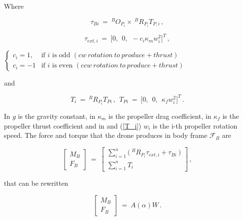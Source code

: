 Where

\begin{equation}
  \label{tau_b_i}
  \tau_{Bi}  \ = \ ^{B}O_{P_{i}} \times\   ^{B}R_{P_{i}} T_{P,i}\, ,
\end{equation}

\begin{equation}
  \label{tau_ext_i}
  \tau_{ext,i}  \ = \  \big[0, \ \  0, \ \  - c_i \kappa_m w_i^2 \big]^T \, ,
\end{equation}

\centerline{ $\begin{cases} c_i = 1, & \mbox{if } i \mbox{ is odd } (cw\ rotation\ to
\ produce + thrust)\\ c_i = -1 & \mbox{if } i\mbox{ is even } (ccw\ rotation\ to
\ produce + thrust) \end{cases}$ }

and

\begin{equation}
  \label{T_i}
  T_i  \ = \ ^{B}R_{P_{i}} T_{Pi} \, ,\ \ T_{Pi}  \ = \ \big[0, \ \ 0, \ \
  \kappa_f w_i^2 \big]^T\, .
\end{equation}

In  $g$ is the gravity constant, in  $\kappa_{m}$
is the propeller drag coefficient, in \Cref{T_i} $\kappa_{f}$ is the propeller
thrust coefficient and in \Cref{tau_ext_i} and (\ref{T_i}) $w_{i}$ is the i-th
propeller rotation speed.
The force and torque that the drone produces in body frame $\mathcal{F}_B$ are

\begin{equation}
  \label{force_eq}
    \begin{bmatrix}
      M_B \\
      F_B
    \end{bmatrix} \ = \
    \begin{bmatrix}
      \sum_{i=1}^{n}  \big(\ ^{B}R_{P_{i}} \tau_{ext,i} + \tau_{Bi} \ \big) \\
      \sum_{i=1}^{n} T_i
    \end{bmatrix}
    \, ,
\end{equation}

that can be rewritten

\begin{equation}
  \label{force_eq_alloc}
    \begin{bmatrix}
      M_B \\
      F_B
    \end{bmatrix} \ = \
    A(\alpha)W
    \, .
\end{equation}


